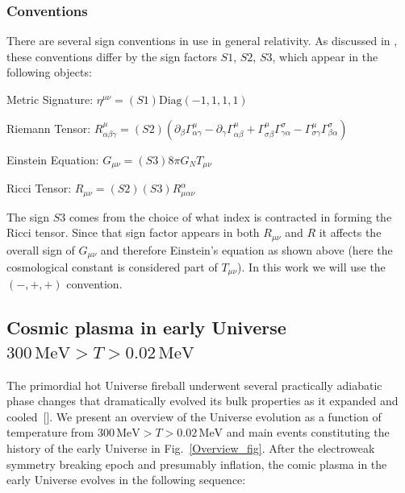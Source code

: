 \subsubsection{Conventions}\label{app:conventions}
There are several sign conventions in use in general relativity.  As discussed in \cite{hobson}, these conventions differ by the sign factors $S1$, $S2$, $S3$, which appear in the following objects:
\vspace{3mm}

Metric Signature: $\eta^{\mu\nu}=(S1)\text{Diag}(-1,1,1,1)$
\vspace{3mm}

Riemann Tensor: $R^\mu_{\alpha\beta\gamma}=(S2)(\partial_{\beta}\Gamma^\mu_{\alpha\gamma}-\partial_{\gamma}\Gamma^\mu_{\alpha\beta}+\Gamma^\mu_{\sigma\beta}\Gamma^\sigma_{\gamma\alpha}-\Gamma^\mu_{\sigma\gamma}\Gamma^\sigma_{\beta\alpha})$
\vspace{3mm}

Einstein Equation: $G_{\mu\nu}=(S3)8\pi G_NT_{\mu\nu}$
\vspace{3mm}

Ricci Tensor: $R_{\mu\nu}=(S2)(S3)R^\alpha_{\mu\alpha\nu}$
\vspace{3mm}

The sign $S3$ comes from the choice of what index is contracted in forming the Ricci tensor.  Since that sign factor appears in both $R_{\mu\nu}$ and $R$ it affects the overall sign of $G_{\mu\nu}$ and therefore Einstein's equation as shown above (here the cosmological constant is considered part of $T_{\mu\nu}$). In this work we will use the $(-,+,+)$ convention.


\subsection{Cosmic plasma in early Universe $300\,\mathrm{MeV}>T>0.02\,\mathrm{MeV}$}

The primordial hot Universe fireball underwent several practically adiabatic phase changes that dramatically evolved its bulk properties as it expanded and cooled~[\cite{Rafelski:2023emw}]. We present an overview of the Universe evolution as a function of temperature from $300\,\mathrm{MeV}>T>0.02\,\mathrm{MeV}$ and main events constituting the history of the early Universe in Fig.~\ref{Overview_fig}. After the electroweak symmetry breaking epoch and presumably inflation, the comic plasma in the early Universe evolves in the following sequence:

